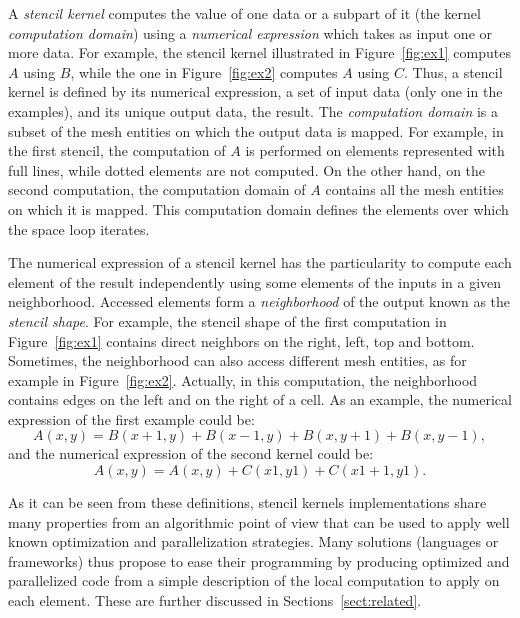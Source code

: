 
A \emph{stencil kernel} computes the value of one data or a subpart of it (the kernel \emph{computation domain}) using a \emph{numerical expression} which takes as input one or more data.
For example, the stencil kernel illustrated in Figure~\ref{fig:ex1} computes $A$ using $B$, while the one in Figure~\ref{fig:ex2} computes $A$ using $C$. Thus, a stencil kernel is defined by its numerical expression, a set of input data (only one in the examples), and its unique output data, the result. 
The \emph{computation domain} is a subset of the mesh entities on which the output data is mapped. For example, in the first stencil, the computation of $A$ is performed on elements represented with full lines, while dotted elements are not computed. On the other hand, on the second computation, the computation domain of $A$ contains all the mesh entities on which it is mapped. This computation domain defines the elements over which the space loop iterates.

The numerical expression of a stencil kernel has the particularity to compute each element of the result independently using some elements of the inputs in a given neighborhood.
Accessed elements form a \emph{neighborhood} of the output known as the \emph{stencil shape}. For example, the stencil shape of the first computation in Figure~\ref{fig:ex1} contains direct neighbors on the right, left, top and bottom. Sometimes, the neighborhood can also access different mesh entities, as for example in Figure~\ref{fig:ex2}. Actually, in this computation, the neighborhood contains edges on the left and on the right of a cell. As an example, the numerical expression of the first example could be:
\begin{equation*} 
A(x,y) = B(x+1,y)+B(x-1,y)+B(x,y+1)+B(x,y-1),
\end{equation*}
and the numerical expression of the second kernel could be:
\begin{equation*} 
A(x,y) = A(x,y)+C(x1,y1)+C(x1+1,y1).
\end{equation*}

As it can be seen from these definitions, stencil kernels implementations share many properties from an algorithmic point of view that can be used to apply well known optimization and parallelization strategies.
Many solutions (languages or frameworks) thus propose to ease their programming by producing optimized and parallelized code from a simple description of the local computation to apply on each element.
These are further discussed in Sections~\ref{sect:related}.

